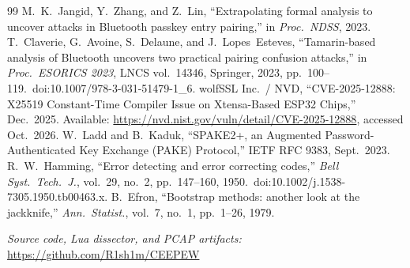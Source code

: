 \documentclass[conference]{IEEEtran}
\newif\ifanonymous
\begin{document}
{\begin{thebibliography}{99}
 M.~K.~Jangid, Y.~Zhang, and Z.~Lin, ``Extrapolating formal analysis to uncover attacks in Bluetooth passkey entry pairing,'' in \textit{Proc.\ NDSS}, 2023.
 T.~Claverie, G.~Avoine, S.~Delaune, and J.~Lopes~Esteves, ``Tamarin-based analysis of Bluetooth uncovers two practical pairing confusion attacks,'' in \textit{Proc.\ ESORICS 2023}, LNCS vol.~14346, Springer, 2023, pp.~100--119.\ doi:10.1007/978-3-031-51479-1\_6.
 wolfSSL Inc.\ / NVD, ``CVE-2025-12888: X25519 Constant-Time Compiler Issue on Xtensa-Based ESP32 Chips,'' Dec.\ 2025. Available: \url{https://nvd.nist.gov/vuln/detail/CVE-2025-12888}, accessed Oct.\ 2026.
 W.~Ladd and B.~Kaduk, ``SPAKE2+, an Augmented Password-Authenticated Key Exchange (PAKE) Protocol,'' IETF RFC 9383, Sept.\ 2023.
 R.~W.~Hamming, ``Error detecting and error correcting codes,'' \textit{Bell Syst.\ Tech.\ J.}, vol.~29, no.~2, pp.~147--160, 1950.\ doi:10.1002/j.1538-7305.1950.tb00463.x.
 B.~Efron, ``Bootstrap methods: another look at the jackknife,'' \textit{Ann.\ Statist.}, vol.~7, no.~1, pp.~1--26, 1979.
\end{thebibliography}
\ifanonymous
\else
\par\vspace{2pt}\noindent\textit{Source code, Lua dissector, and PCAP artifacts:} \url{https://github.com/R1sh1m/CEEPEW}
\fi
}
\end{document}
